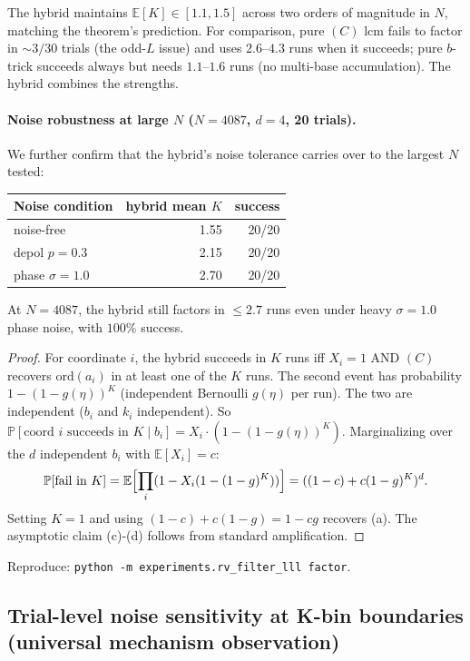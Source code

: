 \documentclass[11pt]{article}
\begin{document}
The hybrid maintains $\mathbb{E}[K] \in [1.1, 1.5]$ across two orders of magnitude in $N$, matching the theorem's prediction. For comparison, pure $(C)$ lcm fails to factor in $\sim 3/30$ trials (the odd-$L$ issue) and uses $2.6$--$4.3$ runs when it succeeds; pure $b$-trick succeeds always but needs $1.1$--$1.6$ runs (no multi-base accumulation). The hybrid combines the strengths.

\paragraph{Noise robustness at large $N$ ($N = 4087$, $d = 4$, 20 trials).}
We further confirm that the hybrid's noise tolerance carries over to the largest $N$ tested:

\begin{center}
\begin{tabular}{lrr}
\toprule
Noise condition & hybrid mean $K$ & success \\
\midrule
noise-free      & 1.55 & 20/20 \\
depol $p=0.3$   & 2.15 & 20/20 \\
phase $\sigma=1.0$ & 2.70 & 20/20 \\
\bottomrule
\end{tabular}
\end{center}

At $N = 4087$, the hybrid still factors in $\leq 2.7$ runs even under heavy $\sigma = 1.0$ phase noise, with $100\%$ success.

\begin{proof}
For coordinate $i$, the hybrid succeeds in $K$ runs iff $X_i = 1$ AND $(C)$ recovers $\mathrm{ord}(a_i)$ in at least one of the $K$ runs. The second event has probability $1 - (1 - g(\eta))^K$ (independent Bernoulli $g(\eta)$ per run). The two are independent ($b_i$ and $k_i$ independent). So $\mathbb{P}[\text{coord } i \text{ succeeds in } K \mid b_i] = X_i \cdot (1 - (1 - g(\eta))^K)$. Marginalizing over the $d$ independent $b_i$ with $\mathbb{E}[X_i] = c$:
\[
  \mathbb{P}[\text{fail in } K] = \mathbb{E}\Bigl[\prod_i (1 - X_i (1 - (1-g)^K))\Bigr]
  = ((1-c) + c(1-g)^K)^d.
\]
Setting $K = 1$ and using $(1 - c) + c(1 - g) = 1 - cg$ recovers (a). The asymptotic claim (c)-(d) follows from standard amplification.
\end{proof}

Reproduce: \texttt{python -m experiments.rv\_filter\_lll factor}.

\subsection{Trial-level noise sensitivity at K-bin boundaries (universal mechanism observation)}
\end{document}
